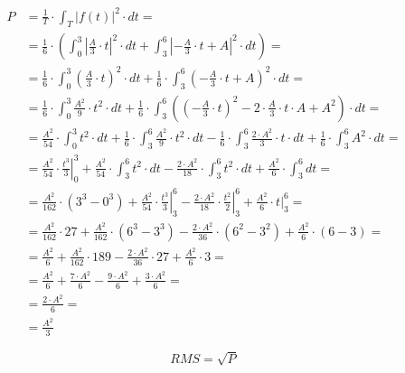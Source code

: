 \begin{task}
\begin{align*}
P&=\frac{1}{T} \cdot \int_{T}^{}\left|f(t)\right|^2 \cdot dt=\\
 &=\frac{1}{6} \cdot \left( \int_{0}^{3}\left|\frac{A}{3}\cdot t \right|^2 \cdot dt
  +\int_{3}^{6}\left|-\frac{A}{3}\cdot t + A\right|^2 \cdot dt \right)=\\ 
 &=\frac{1}{6} \cdot \int_{0}^{3}\left(\frac{A}{3}\cdot t \right)^2 \cdot dt
  +\frac{1}{6} \cdot \int_{3}^{6}\left(-\frac{A}{3}\cdot t + A\right)^2 \cdot dt=\\ 
 &=\frac{1}{6} \cdot \int_{0}^{3}\frac{A^2}{9}\cdot t^2 \cdot dt
 +\frac{1}{6} \cdot \int_{3}^{6}\left(\left(-\frac{A}{3}\cdot t\right)^2 - 2\cdot \frac{A}{3}\cdot t \cdot  A + A^2 \right) \cdot dt=\\ 
 &=\frac{A^2}{54}\cdot \int_{0}^{3} t^2 \cdot dt
 +\frac{1}{6} \cdot \int_{3}^{6}\frac{A^2}{9}\cdot t^2 \cdot dt - \frac{1}{6} \cdot \int_{3}^{6} \frac{2 \cdot A^2}{3}\cdot t \cdot dt + \frac{1}{6} \cdot \int_{3}^{6} A^2 \cdot dt=\\
 &=\frac{A^2}{54}\cdot \left. \frac{t^3}{3} \right|_{0}^{3}
 +\frac{A^2}{54}\cdot \int_{3}^{6} t^2 \cdot dt - \frac{2 \cdot A^2}{18}\cdot \int_{3}^{6} t^2 \cdot dt +\frac{A^2}{6}\cdot \int_{3}^{6} dt=\\
 &=\frac{A^2}{162}\cdot \left(3^3 - 0^3\right) + \frac{A^2}{54}\cdot \left. \frac{t^3}{3} \right|_{3}^{6} - \frac{2 \cdot A^2}{18}\cdot \left. \frac{t^2}{2} \right|_{3}^{6} + \frac{A^2}{6}\cdot \left. t \right|_{3}^{6}=\\
 &=\frac{A^2}{162}\cdot 27 + \frac{A^2}{162}\cdot \left(6^3 - 3^3\right) - \frac{2 \cdot A^2}{36}\cdot \left(6^2 - 3^2\right) + \frac{A^2}{6}\cdot (6-3)=\\
 &=\frac{A^2}{6} + \frac{A^2}{162}\cdot 189 - \frac{2 \cdot A^2}{36}\cdot 27 + \frac{A^2}{6}\cdot 3=\\
 &=\frac{A^2}{6} + \frac{7 \cdot A^2}{6} - \frac{9 \cdot A^2}{6} + \frac{3 \cdot A^2}{6}=\\
 &=\frac{2 \cdot A^2}{6}=\\
 &=\frac{A^2}{3}
\end{align*}


\begin{equation}
RMS=\sqrt P
\end{equation}

\end{task}